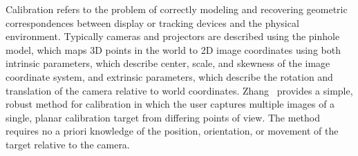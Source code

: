 \documentclass[review]{vgtc}                 %
\begin{document}
Calibration refers to the problem of correctly modeling and recovering
geometric correspondences between display or tracking devices and the
physical environment.
Typically cameras and projectors are described using the pinhole
model, which maps 3D points in the world to 2D image coordinates using
both intrinsic parameters, which describe center, scale, and skewness
of the image coordinate system, and extrinsic parameters, which
describe the rotation and translation of the camera relative to world
coordinates.  Zhang~\cite{Zhang2000} provides
a simple, robust method
for calibration in which the user captures multiple images of a
single, planar calibration target from differing points of view.  
The
method requires no a priori knowledge of the position, orientation, or
movement of the target relative to the camera.  

\end{document}
